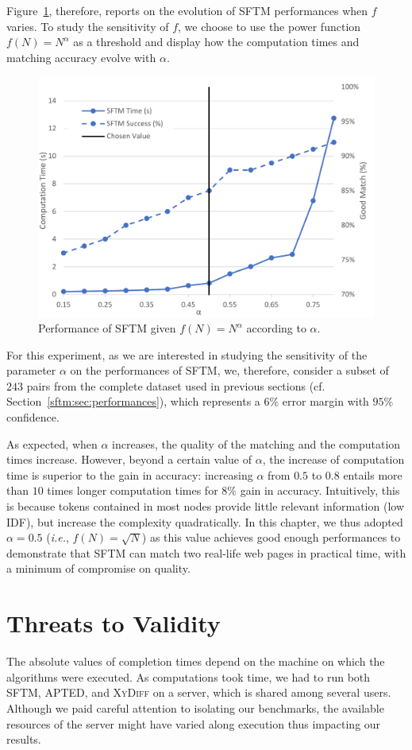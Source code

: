 Figure~\ref{sftm:fig:parameter}, therefore, reports on the evolution of SFTM performances when $f$ varies.
To study the sensitivity of $f$, we choose to use the power function $f(N) = N^\alpha$ as a threshold and display how the computation times and matching accuracy evolve with $\alpha$.

\begin{figure}
    \centering
    \includegraphics[width=.8\linewidth]{tree-matching/graphs/sensitivity}
    \caption{Performance of SFTM given $f(N) = N^\alpha$ according to $\alpha$.}
    \label{sftm:fig:parameter}
\end{figure}

For this experiment, as we are interested in studying the sensitivity of the parameter $\alpha$ on the performances of SFTM, we, therefore, consider a subset of $243$ pairs from the complete dataset used in previous sections (cf. Section~\ref{sftm:sec:performances}), which represents a $6\%$ error margin with $95\%$ confidence.

As expected, when $\alpha$ increases, the quality of the matching and the computation times increase.
However, beyond a certain value of $\alpha$, the increase of computation time is superior to the gain in accuracy: increasing $\alpha$ from $0.5$ to $0.8$ entails more than $10$ times longer computation times for $8\%$ gain in accuracy. 
Intuitively, this is because tokens contained in most nodes provide little relevant information (low IDF), but increase the complexity quadratically.
In this chapter, we thus adopted $\alpha = 0.5$ (\emph{i.e.}, $f(N) = \sqrt{N}$) as this value achieves good enough performances to demonstrate that SFTM can match two real-life web pages in practical time, with a minimum of compromise on quality.  

\section{Threats to Validity}\label{sftm:sec:threats}
The absolute values of completion times depend on the machine on which the algorithms were executed.
As computations took time, we had to run both SFTM, APTED, and \textsc{XyDiff} on a server, which is shared among several users.
Although we paid careful attention to isolating our benchmarks, the available resources of the server might have varied along execution thus impacting our results.


